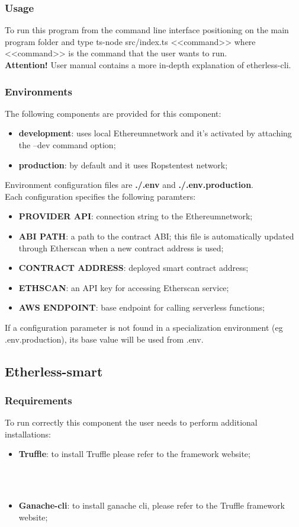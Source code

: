 \subsubsection{Usage}
To run this program from the command line interface positioning on the main program folder
and type ts-node src/index.ts <<command>> where <<command>> is the command that the user wants to run.\\
\textbf{Attention!} User manual contains a more in-depth explanation of etherless-cli.
\subsubsection{Environments}
The following components are provided for this component:
\begin{itemize}
	\item \textbf{development}: uses local Ethereum\glo network and it's activated by attaching the --dev command option;
	\item \textbf{production}: by default and it uses Ropsten\glo test network;
\end{itemize}
Environment configuration files are \textbf{./.env} and \textbf{./.env.production}.
\\Each configuration specifies the following paramters:
\begin{itemize}
	\item \textbf{PROVIDER API}: connection string to the Ethereum\glo network;
	\item \textbf{ABI PATH}: a path to the contract ABI; this file is automatically updated through Etherscan when a new contract address is used;
	\item \textbf{CONTRACT ADDRESS}: deployed smart contract address;
	\item \textbf{ETHSCAN}: an API key for accessing Etherscan service;
	\item \textbf{AWS ENDPOINT}: base endpoint for calling serverless functions;
\end{itemize}
If a configuration parameter is not found in a specialization environment (eg .env.production), its base value will be used from .env.
\subsection{Etherless-smart}
\subsubsection{Requirements}
To run correctly this component the user needs to perform additional installations:
\begin{itemize}
    \item \textbf{Truffle}: to install Truffle please refer to the framework website; \\\\\centerline{}\\
    \item \textbf{Ganache-cli}: to install ganache cli, please refer to the Truffle framework website;  \\\\\centerline{}
\end{itemize}

